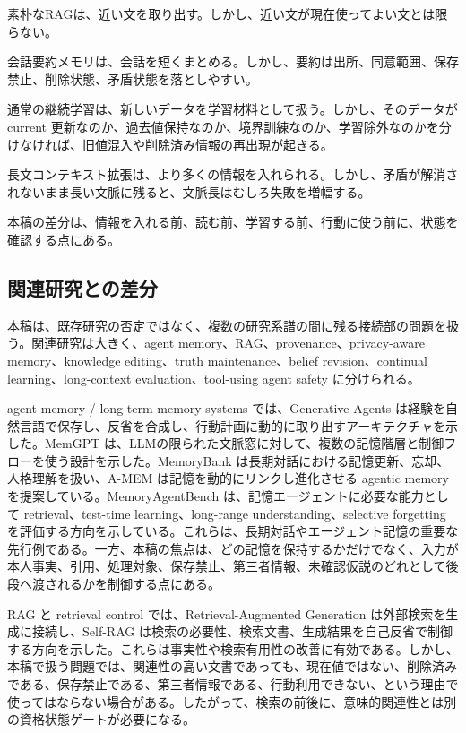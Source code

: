 \documentclass[12pt,a4paper]{article}
\begin{document}
素朴なRAGは、近い文を取り出す。しかし、近い文が現在使ってよい文とは限らない。

会話要約メモリは、会話を短くまとめる。しかし、要約は出所、同意範囲、保存禁止、削除状態、矛盾状態を落としやすい。

通常の継続学習は、新しいデータを学習材料として扱う。しかし、そのデータが current 更新なのか、過去値保持なのか、境界訓練なのか、学習除外なのかを分けなければ、旧値混入や削除済み情報の再出現が起きる。

長文コンテキスト拡張は、より多くの情報を入れられる。しかし、矛盾が解消されないまま長い文脈に残ると、文脈長はむしろ失敗を増幅する。

本稿の差分は、情報を入れる前、読む前、学習する前、行動に使う前に、状態を確認する点にある。

\subsection{関連研究との差分}\label{ux95a2ux9023ux7814ux7a76ux3068ux306eux5deeux5206}

本稿は、既存研究の否定ではなく、複数の研究系譜の間に残る接続部の問題を扱う。関連研究は大きく、agent memory、RAG、provenance、privacy-aware memory、knowledge editing、truth maintenance、belief revision、continual learning、long-context evaluation、tool-using agent safety に分けられる。

agent memory / long-term memory systems では、Generative Agents は経験を自然言語で保存し、反省を合成し、行動計画に動的に取り出すアーキテクチャを示した。MemGPT は、LLMの限られた文脈窓に対して、複数の記憶階層と制御フローを使う設計を示した。MemoryBank は長期対話における記憶更新、忘却、人格理解を扱い、A-MEM は記憶を動的にリンクし進化させる agentic memory を提案している。MemoryAgentBench は、記憶エージェントに必要な能力として retrieval、test-time learning、long-range understanding、selective forgetting を評価する方向を示している。これらは、長期対話やエージェント記憶の重要な先行例である。一方、本稿の焦点は、どの記憶を保持するかだけでなく、入力が本人事実、引用、処理対象、保存禁止、第三者情報、未確認仮説のどれとして後段へ渡されるかを制御する点にある。

RAG と retrieval control では、Retrieval-Augmented Generation は外部検索を生成に接続し、Self-RAG は検索の必要性、検索文書、生成結果を自己反省で制御する方向を示した。これらは事実性や検索有用性の改善に有効である。しかし、本稿で扱う問題では、関連性の高い文書であっても、現在値ではない、削除済みである、保存禁止である、第三者情報である、行動利用できない、という理由で使ってはならない場合がある。したがって、検索の前後に、意味的関連性とは別の資格状態ゲートが必要になる。
\end{document}

